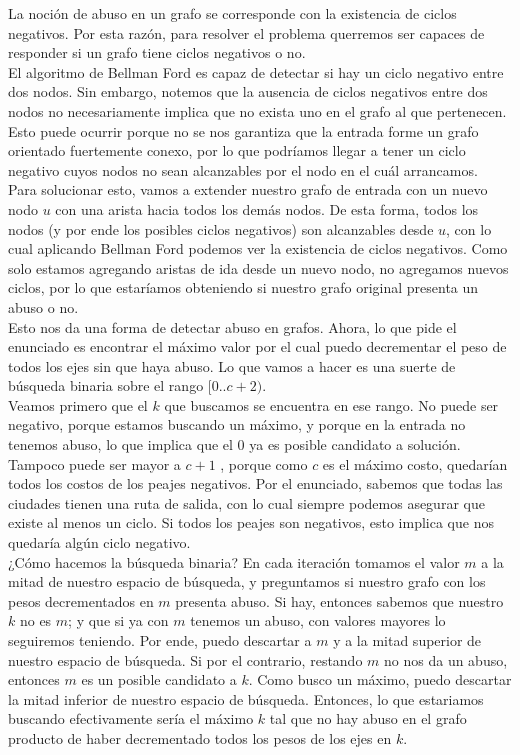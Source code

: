 La noción de abuso en un grafo se corresponde con la existencia de ciclos negativos. Por esta razón, para resolver el problema querremos ser capaces de responder si un grafo tiene ciclos negativos o no. \\

El algoritmo de Bellman Ford es capaz de detectar si hay un ciclo negativo entre dos nodos. Sin embargo, notemos que la ausencia de ciclos negativos entre dos nodos no necesariamente implica que no exista uno en el grafo al que pertenecen. Esto puede ocurrir porque no se nos garantiza que la entrada forme un grafo orientado fuertemente conexo, por lo que podríamos llegar a tener un ciclo negativo cuyos nodos no sean alcanzables por el nodo en el cuál arrancamos. \\

Para solucionar esto, vamos a extender nuestro grafo de entrada con un nuevo nodo $u$ con una arista hacia todos los demás nodos. De esta forma, todos los nodos (y por ende los posibles ciclos negativos) son alcanzables desde $u$, con lo cual aplicando Bellman Ford podemos ver la existencia de ciclos negativos. Como solo estamos agregando aristas de ida desde un nuevo nodo, no agregamos nuevos ciclos, por lo que estaríamos obteniendo si nuestro grafo original presenta un abuso o no. \\

Esto nos da una forma de detectar abuso en grafos. Ahora, lo que pide el enunciado es encontrar el máximo valor por el cual puedo decrementar el peso de todos los ejes sin que haya abuso. Lo que vamos a hacer es una suerte de búsqueda binaria sobre el rango $[0..c+2)$. \\

Veamos primero que el $k$ que buscamos se encuentra en ese rango. No puede ser negativo, porque estamos buscando un máximo, y porque en la entrada no tenemos abuso, lo que implica que el $0$ ya es posible candidato a solución. Tampoco puede ser mayor a $c+1$ , porque como $c$ es el máximo costo, quedarían todos los costos de los peajes negativos. Por el enunciado, sabemos que todas las ciudades tienen una ruta de salida, con lo cual siempre podemos asegurar que existe al menos un ciclo. Si todos los peajes son negativos, esto implica que nos quedaría algún ciclo negativo. \\

¿Cómo hacemos la búsqueda binaria? En cada iteración tomamos el valor $m$ a la mitad de nuestro espacio de búsqueda, y preguntamos si nuestro grafo con los pesos decrementados en $m$ presenta abuso. Si hay, entonces sabemos que nuestro $k$ no es $m$; y que si ya con $m$ tenemos un abuso, con valores mayores lo seguiremos teniendo. Por ende, puedo descartar a $m$ y a la mitad superior de nuestro espacio de búsqueda. Si por el contrario, restando $m$ no nos da un abuso, entonces $m$ es un posible candidato a $k$. Como busco un máximo, puedo descartar la mitad inferior de nuestro espacio de búsqueda. Entonces, lo que estariamos buscando efectivamente sería el máximo $k$ tal que no hay abuso en el grafo producto de haber decrementado todos los pesos de los ejes en $k$. \\

